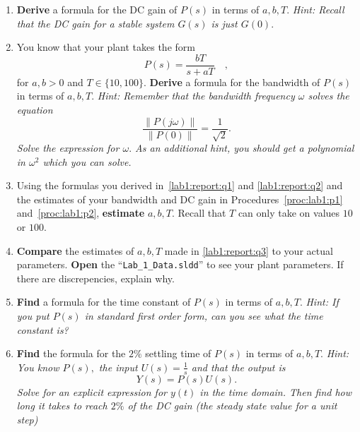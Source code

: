 \begin{deliverable}[label={lab1:report}]
  \begin{enumerate}[label={(\arabic*)}]
    \item{
      \textbf{Derive} a formula for the DC gain of \(P(s)\) in terms of
      \(a, b, T.\)
      \emph{Hint: Recall that the DC gain for a stable system \(G(s)\)
      is just \(G(0).\)}
      \label{lab1:report:q1}
    }
    \item{
      You know that your plant takes the form
      \[
        P(s) = \frac{b T}{s + a T}\quad ,
      \]
      for \(a, b > 0\) and \(T \in \{10, 100\}.\) \textbf{Derive} a
      formula for the bandwidth of \(P(s)\) in terms of \(a, b, T.\)
      \emph{Hint: Remember that the bandwidth frequency \(\omega\) solves
      the equation}
      \[
        \frac{\left\|P(j \omega)\right\|}{\left\|P(0)\right\|}
        =
        \frac{1}{\sqrt{2}}.
      \]
      \emph{Solve the expression for \(\omega.\) As
      an additional hint, you should get a polynomial in \(\omega^2\) which
      you can solve.}
      \label{lab1:report:q2}
    }
    \item{
      Using the formulas you derived in~\ref{lab1:report:q1} and
      \ref{lab1:report:q2} and the estimates of your bandwidth and DC gain
      in Procedures~\ref{proc:lab1:p1} and~\ref{proc:lab1:p2},
      \textbf{estimate} \(a, b, T.\) Recall that \(T\) can only take on
      values \(10\) or \(100.\)
      \label{lab1:report:q3}
    }
    \item{
      \textbf{Compare} the estimates of \(a, b, T\) made in
      \ref{lab1:report:q3} to your actual parameters.
      \textbf{Open} the ``\texttt{Lab\_1\_Data.sldd}'' to see your plant
      parameters. If there are discrepencies, explain why.
      \label{lab1:report:q4}
    }
    \item{
      \textbf{Find} a formula for the time constant of \(P(s)\) in terms of
      \(a, b, T.\) \emph{Hint: If you put \(P(s)\) in standard first order
      form, can you see what the time constant is?}
      \label{lab1:report:q5}
    }
    \item{
      \textbf{Find} the formula for the \(2\%\) settling time of \(P(s)\) in terms of \(a, b, T.\)
      \emph{Hint: You know \(P(s),\) the input \(U(s) = \frac{1}{s}\) and that
      the output is}
      \[
        Y(s) = P(s) U(s).
      \]
      \emph{Solve for an explicit expression for \(y(t)\) in the time domain.
      Then find how long it takes to reach \(2\%\) of the DC gain (the steady
      state value for a unit step)}
}
\end{enumerate}
\end{deliverable}

